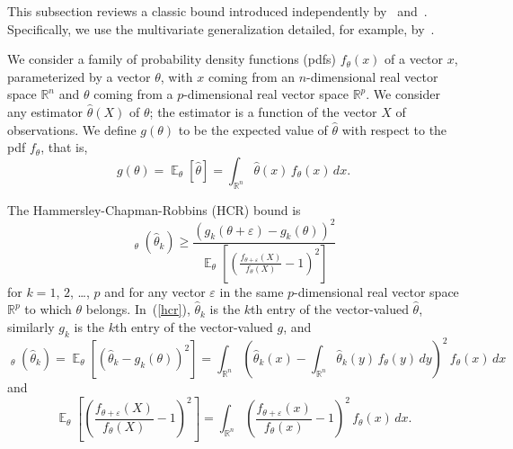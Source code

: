 \documentclass[]{fairmeta}
\DeclareMathOperator{\E}{\mathop{}\mathbb{E}}
\DeclareMathOperator{\var}{\mathop{}{Var}}
\renewcommand{\epsilon}{\varepsilon}
\begin{document}
This subsection reviews a classic bound introduced independently
by~\cite{hammersley} and~\cite{chapman-robbins}.
Specifically, we use the multivariate generalization detailed, for example,
by~\cite{wikipedia}.

We consider a family of probability density functions (pdfs) $f_{\theta}(x)$
of a vector $x$, parameterized by a vector $\theta$,
with $x$ coming from an $n$-dimensional real vector space $\mathbb{R}^n$
and $\theta$ coming from a $p$-dimensional real vector space $\mathbb{R}^p$.
We consider any estimator $\hat\theta(X)$ of $\theta$;
the estimator is a function of the vector $X$ of observations.
We define $g(\theta)$ to be the expected value of $\hat\theta$
with respect to the pdf $f_{\theta}$, that is,
%
\begin{equation}
g(\theta) = \E_{\theta}[\hat\theta]
= \int_{\mathbb{R}^n} \hat\theta(x) \, f_{\theta}(x) \, dx.
\end{equation}

The Hammersley-Chapman-Robbins (HCR) bound is
%
\begin{equation}
\label{hcr}
\var_{\theta}(\hat\theta_k)
\ge \frac{(g_k(\theta + \epsilon) - g_k(\theta))^2}
         {\E_{\theta}\left[\left(
          \frac{f_{\theta + \epsilon}(X)}{f_{\theta}(X)} - 1\right)^2 \right]}
\end{equation}
%
for $k = 1$, $2$, \dots, $p$
and for any vector $\epsilon$ in the same $p$-dimensional real vector space
$\mathbb{R}^p$ to which $\theta$ belongs.
In~(\ref{hcr}),
$\hat\theta_k$ is the $k$th entry of the vector-valued $\hat\theta$,
similarly $g_k$ is the $k$th entry of the vector-valued $g$, and
%
\begin{equation}
\var_{\theta}(\hat\theta_k)
= \E_{\theta}\left[ (\hat\theta_k - g_k(\theta))^2 \right]
= \int_{\mathbb{R}^n} \left( \hat\theta_k(x)
- \int_{\mathbb{R}^n} \hat\theta_k(y) \, f_{\theta}(y) \, dy \right)^2
\, f_{\theta}(x) \, dx
\end{equation}
%
and
%
\begin{equation}
\E_{\theta}\left[\left(
\frac{f_{\theta + \epsilon}(X)}{f_{\theta}(X)} - 1\right)^2 \right]
= \int_{\mathbb{R}^n}
\left(\frac{f_{\theta + \epsilon}(x)}{f_{\theta}(x)} - 1\right)^2
\, f_{\theta}(x) \, dx.
\end{equation}
\end{document}

